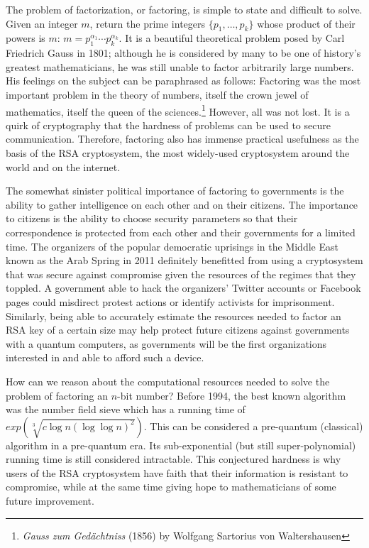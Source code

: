 The problem of factorization, or factoring,
is simple to state and difficult to solve.
Given an integer $m$, return the prime integers $\{p_1, \ldots, p_k\}$ whose
product of their powers is $m$: $m = p_1^{\alpha_1}\cdots p_k^{\alpha_k}$.
It is a beautiful theoretical problem posed by Carl Friedrich Gauss in 1801;
although he is considered by many to be one of history's greatest mathematicians,
he was still unable to factor arbitrarily large numbers. 
His feelings on the subject can be paraphrased as follows:
Factoring was the most important problem in the theory of
numbers, itself the crown jewel of mathematics, itself
the queen of the sciences.\footnote{\emph{Gauss zum Ged\"achtniss} (1856) by
Wolfgang Sartorius von Waltershausen}
However, all was not lost.
It is a quirk of cryptography that the hardness of problems can be used
to secure communication. Therefore, factoring also has immense practical
usefulness as the basis of the RSA cryptosystem, the most widely-used
cryptosystem around the world and on the internet.

The somewhat sinister political importance of factoring to
governments is the ability to gather intelligence on each other and on their
citizens. The importance to citizens is the ability to choose security
parameters so that their correspondence is protected from each other and
their governments for a limited time.
The organizers of the popular democratic uprisings in the Middle East known
as the Arab Spring in 2011 definitely benefitted from using a cryptosystem that was
secure against compromise given the resources of the regimes that they toppled.
A government able to hack the organizers' Twitter accounts or Facebook pages
could misdirect protest actions or identify activists for imprisonment.
Similarly, being able to accurately estimate the resources needed to factor
an RSA key of a certain size may help protect future citizens against
governments with a quantum computers, as governments will be the first
organizations interested in and able to afford such a device.

How can we reason about the computational resources needed to solve the
problem of factoring an $n$-bit number?
Before 1994, the best known algorithm was the
number field sieve which has a running time of
$exp(\sqrt[3]{c \log n (\log \log n)^2})$\cite{Lenstra1993}.
This can be considered a pre-quantum (classical)
algorithm in a pre-quantum era. Its sub-exponential (but still super-polynomial)
running time is still considered intractable.
This conjectured hardness is why users of the RSA cryptosystem have faith
that their information is resistant to compromise, while at the same time
giving hope to mathematicians of some future improvement.

